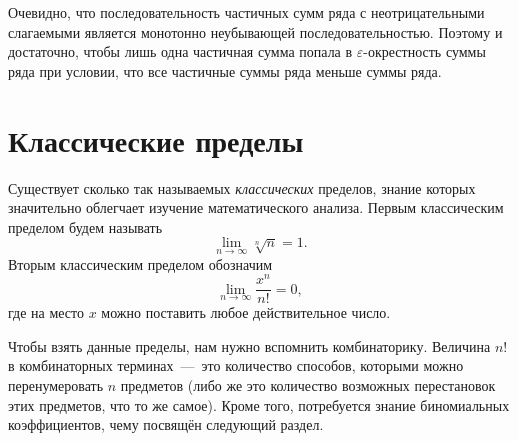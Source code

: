 \documentclass[12pt]{article}
\begin{document}
Очевидно, что последовательность частичных сумм ряда с неотрицательными слагаемыми является монотонно неубывающей последовательностью. Поэтому и достаточно, чтобы лишь одна частичная сумма попала в $\varepsilon$\--окрестность суммы ряда при условии, что все частичные суммы ряда меньше суммы ряда.

\section{Классические пределы}
Существует сколько так называемых \emph{классических} пределов, знание которых значительно облегчает изучение математического анализа. Первым классическим пределом будем называть
\begin{equation}
    \lim_{n\rightarrow\infty}{\sqrt[n]{n}}=1.
\end{equation}
Вторым классическим пределом обозначим
\begin{equation}
    \lim_{n\rightarrow\infty} {\dfrac{x^n}{n!}} = 0,
\end{equation}
где на место $x$ можно поставить любое действительное число. 
\par
Чтобы взять данные пределы, нам нужно вспомнить комбинаторику. Величина $n!$ в комбинаторных терминах~\----~это количество способов, которыми можно перенумеровать $n$ предметов (либо же это количество возможных перестановок этих предметов, что то же самое). Кроме того, потребуется знание биномиальных коэффициентов, чему посвящён следующий раздел.
\end{document}

